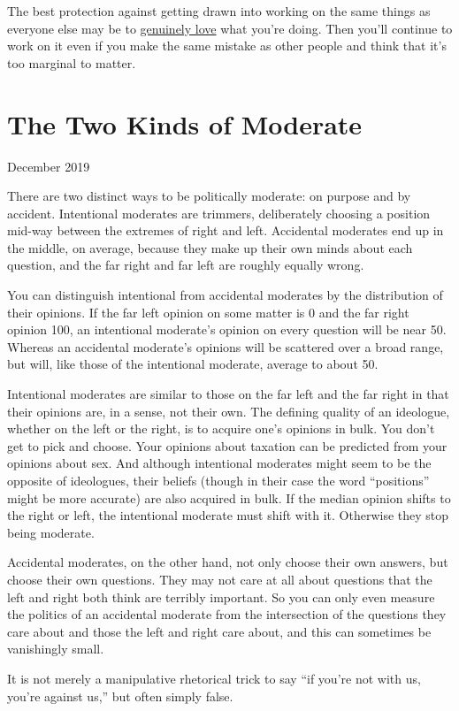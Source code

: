 \documentclass[12pt]{book}
\begin{document}
The best protection against getting drawn into working on the same
things as everyone else may be to \href{genius.html}{genuinely love}
what you're doing. Then you'll continue to work on it even if you make
the same mistake as other people and think that it's too marginal to
matter.
\chapter{The Two Kinds of Moderate}

December 2019

There are two distinct ways to be politically moderate: on purpose and
by accident. Intentional moderates are trimmers, deliberately choosing a
position mid-way between the extremes of right and left. Accidental
moderates end up in the middle, on average, because they make up their
own minds about each question, and the far right and far left are
roughly equally wrong.

You can distinguish intentional from accidental moderates by the
distribution of their opinions. If the far left opinion on some matter
is 0 and the far right opinion 100, an intentional moderate's opinion on
every question will be near 50. Whereas an accidental moderate's
opinions will be scattered over a broad range, but will, like those of
the intentional moderate, average to about 50.

Intentional moderates are similar to those on the far left and the far
right in that their opinions are, in a sense, not their own. The
defining quality of an ideologue, whether on the left or the right, is
to acquire one's opinions in bulk. You don't get to pick and choose.
Your opinions about taxation can be predicted from your opinions about
sex. And although intentional moderates might seem to be the opposite of
ideologues, their beliefs (though in their case the word ``positions''
might be more accurate) are also acquired in bulk. If the median opinion
shifts to the right or left, the intentional moderate must shift with
it. Otherwise they stop being moderate.

Accidental moderates, on the other hand, not only choose their own
answers, but choose their own questions. They may not care at all about
questions that the left and right both think are terribly important. So
you can only even measure the politics of an accidental moderate from
the intersection of the questions they care about and those the left and
right care about, and this can sometimes be vanishingly small.

It is not merely a manipulative rhetorical trick to say ``if you're not
with us, you're against us,'' but often simply false.
\end{document}
